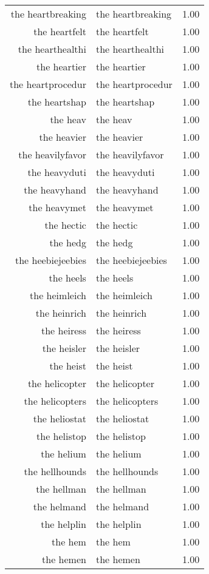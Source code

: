 \begin{table}[ht]
\begin{tabular}{rlr}
  the heartbreaking & the heartbreaking & 1.00 \\ 
  the heartfelt & the heartfelt & 1.00 \\ 
  the hearthealthi & the hearthealthi & 1.00 \\ 
  the heartier & the heartier & 1.00 \\ 
  the heartprocedur & the heartprocedur & 1.00 \\ 
  the heartshap & the heartshap & 1.00 \\ 
  the heav & the heav & 1.00 \\ 
  the heavier & the heavier & 1.00 \\ 
  the heavilyfavor & the heavilyfavor & 1.00 \\ 
  the heavyduti & the heavyduti & 1.00 \\ 
  the heavyhand & the heavyhand & 1.00 \\ 
  the heavymet & the heavymet & 1.00 \\ 
  the hectic & the hectic & 1.00 \\ 
  the hedg & the hedg & 1.00 \\ 
  the heebiejeebies & the heebiejeebies & 1.00 \\ 
  the heels & the heels & 1.00 \\ 
  the heimleich & the heimleich & 1.00 \\ 
  the heinrich & the heinrich & 1.00 \\ 
  the heiress & the heiress & 1.00 \\ 
  the heisler & the heisler & 1.00 \\ 
  the heist & the heist & 1.00 \\ 
  the helicopter & the helicopter & 1.00 \\ 
  the helicopters & the helicopters & 1.00 \\ 
  the heliostat & the heliostat & 1.00 \\ 
  the helistop & the helistop & 1.00 \\ 
  the helium & the helium & 1.00 \\ 
  the hellhounds & the hellhounds & 1.00 \\ 
  the hellman & the hellman & 1.00 \\ 
  the helmand & the helmand & 1.00 \\ 
  the helplin & the helplin & 1.00 \\ 
  the hem & the hem & 1.00 \\ 
  the hemen & the hemen & 1.00 \\ 

\end{tabular}
\end{table}
